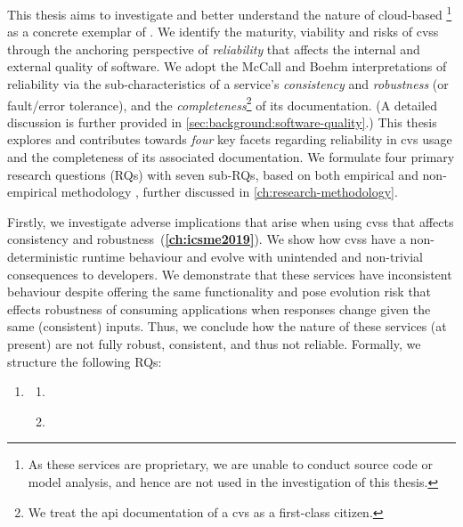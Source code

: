 This thesis aims to investigate and better understand the nature of cloud-based \footnote{As these services are proprietary, we are unable to conduct source code or model analysis, and hence are not used in the investigation of this thesis.} as a concrete exemplar of .
We identify the maturity, viability and risks of \glspl{cvs} through the anchoring perspective of \textit{reliability} that affects the internal and external quality of software. We adopt the McCall \citep{McCall:1977uy} and Boehm \citep{Boehm:1978vv} interpretations of reliability via the sub-characteristics of a service's \textit{consistency} and \textit{robustness} (or fault/error tolerance), and the \textit{completeness}\footnote{We treat the \gls{api} documentation of a \gls{cvs} as a first-class citizen.} of its documentation. (A detailed discussion is further provided in \cref{sec:background:software-quality}.)
This thesis explores and contributes towards \textit{four} key facets regarding reliability in \gls{cvs} usage and the completeness of its associated documentation. We formulate four primary research questions (RQs) with seven sub-RQs, based on both empirical and non-empirical  methodology \citep{Simon:1996uw}, further discussed in \cref{ch:research-methodology}.

Firstly, we investigate adverse implications that arise when using \glspl{cvs} that affects consistency and robustness~(\textbf{\cref{ch:icsme2019}}). We show how \glspl{cvs} have a non-deterministic runtime behaviour and evolve with unintended and non-trivial consequences to developers. We demonstrate that these services have inconsistent behaviour despite offering the same functionality and pose evolution risk that effects robustness of consuming applications when responses change given the same (consistent) inputs. Thus, we conclude how the nature of these services (at present) are not fully robust, consistent, and thus not reliable. Formally, we structure the following RQs:

\begin{leftbar}
\begin{enumerate}[label=\faQuestionCircle~~\textbf{RQ\arabic*.}, ref=RQ\arabic*, leftmargin=2.5\parindent, rightmargin=1\parindent]
    \item \textbf{\RQOneTextLandscapeAnalysis{}}\label{rq:nature}
    \begin{enumerate}[label=\textit{RQ1.\arabic*.}, ref=RQ1.\arabic*]
      \item \RQOneTextLandscapeAnalysisRuntime{}\label{rq:nature:runtime}
      \item \RQOneTextLandscapeAnalysisEvolution{}\label{rq:nature:evolution}
    \end{enumerate}
\end{enumerate}
\end{leftbar}

